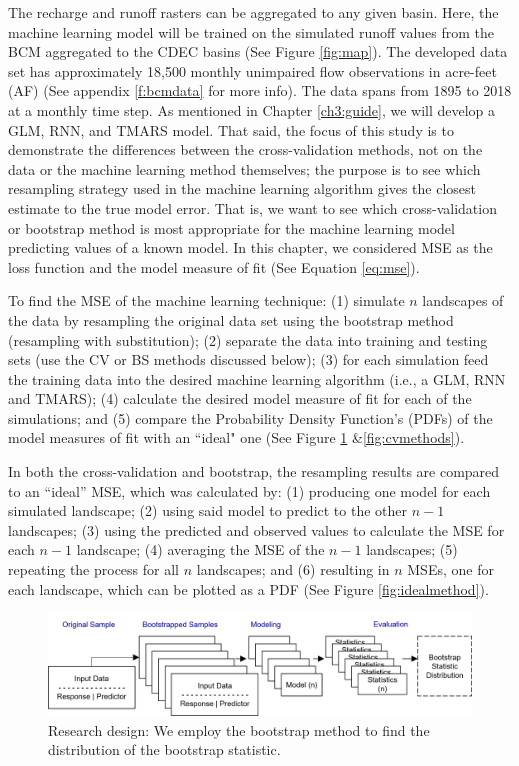 The recharge and runoff rasters can be aggregated to any given basin. Here, the machine learning model will be trained on the simulated runoff values from the BCM aggregated to the CDEC basins (See Figure \ref{fig:map}). The developed data set has approximately 18,500 monthly unimpaired flow observations in acre-feet (AF) (See appendix \ref{f:bcmdata} for more info). The data spans from 1895 to 2018 at a monthly time step. As mentioned in Chapter \ref{ch3:guide}, we will develop a GLM, RNN, and TMARS model. That said, the focus of this study is to demonstrate the differences between the cross-validation methods, not on the data or the machine learning method themselves; the purpose is to see which resampling strategy used in the machine learning algorithm gives the closest estimate to the true model error. That is, we want to see which cross-validation or bootstrap method is most appropriate for the machine learning model predicting values of a known model. In this chapter, we considered MSE as the loss function and the model measure of fit (See Equation \ref{eq:mse}).

To find the MSE of the machine learning technique: (1) simulate $n$ landscapes of the data by resampling the original data set using the bootstrap method (resampling with substitution); (2) separate the data into training and testing sets (use the CV or BS methods discussed below); (3) for each simulation feed the training data into the desired machine learning algorithm (i.e., a GLM, RNN and TMARS); (4) calculate the desired model measure of fit for each of the simulations; and (5) compare the Probability Density Function's (PDFs) of the model measures of fit with an ``ideal" one (See Figure \ref{fig:bsmethods} \&\ref{fig:cvmethods}).   

In both the cross-validation and bootstrap, the resampling results are compared to an ``ideal'' MSE, which was calculated by: (1) producing one model for each simulated landscape; (2) using said model to predict to the other $n-1$ landscapes; (3) using the predicted and observed values to calculate the MSE for each $n-1$ landscape; (4) averaging the MSE of the $n-1$ landscapes; (5) repeating the process for all $n$ landscapes; and (6) resulting in $n$ MSEs, one for each landscape, which can be plotted as a PDF (See Figure \ref{fig:idealmethod}). 

\begin{figure}[ht]
	\centering
	\includegraphics[width=15cm,trim={0 0 0 0},clip=true]{plots/bs_flowchart.png}
	\caption{Research design: We employ the bootstrap method to find the distribution of the bootstrap statistic.} 
	\label{fig:bsmethods}
\end{figure}

